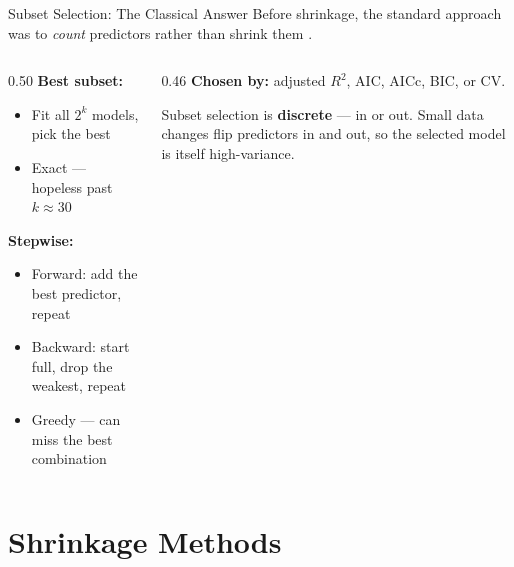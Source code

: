 \documentclass[aspectratio=169, 11pt]{beamer}
\begin{document}
\begin{frame}{Subset Selection: The Classical Answer}
  Before shrinkage, the standard approach was to \emph{count} predictors
  rather than shrink them \parencite{Guyon2003}.
  \begin{columns}[T]
    \begin{column}{0.50\textwidth}
      \textbf{Best subset:}
      \begin{itemize}\footnotesize\itemsep0pt
        \item Fit all $2^k$ models, pick the best
        \item Exact --- hopeless past $k \approx 30$
      \end{itemize}
      \vspace{0.1cm}
      \textbf{Stepwise:}
      \begin{itemize}\footnotesize\itemsep0pt
        \item Forward: add the best predictor, repeat
        \item Backward: start full, drop the weakest, repeat
        \item Greedy --- can miss the best combination
      \end{itemize}
    \end{column}
    \begin{column}{0.46\textwidth}
      \textbf{Chosen by:} adjusted $R^2$, AIC, AICc, BIC, or CV.
      \vspace{0.1cm}
      \begin{warningbox}
        \footnotesize Subset selection is \textbf{discrete} --- in or out.
        Small data changes flip predictors in and out, so the selected
        model is itself high-variance.
      \end{warningbox}
    \end{column}
  \end{columns}
\end{frame}

\section{Shrinkage Methods}
\end{document}
